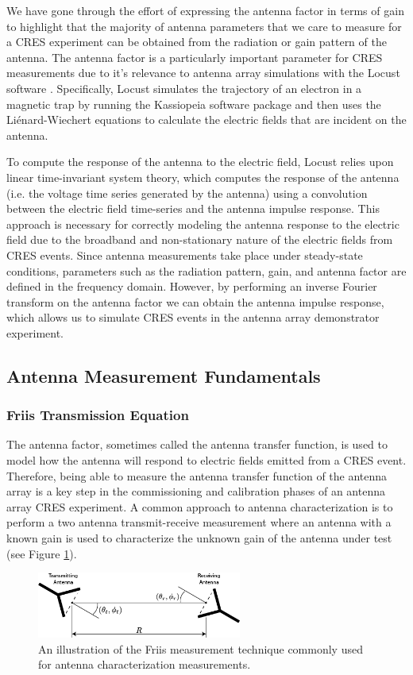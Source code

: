 We have gone through the effort of expressing the antenna factor in terms of gain to highlight that the majority of antenna parameters that we care to measure for a CRES experiment can be obtained from the radiation or gain pattern of the antenna. The antenna factor is a particularly important parameter for CRES measurements due to it's relevance to antenna array simulations with the Locust software \cite{p8locustpaper, nb_thesis}. Specifically, Locust simulates the trajectory of an electron in a magnetic trap by running the Kassiopeia software package \cite{kassiopeia} and then uses the Li\'{e}nard-Wiechert equations to calculate the electric fields that are incident on the antenna. 

To compute the response of the antenna to the electric field, Locust relies upon linear time-invariant system theory, which computes the response of the antenna (i.e. the voltage time series generated by the antenna) using a convolution between the electric field time-series and the antenna impulse response. This approach is necessary for correctly modeling the antenna response to the electric field due to the broadband and non-stationary nature of the electric fields from CRES events. Since antenna measurements take place under steady-state conditions, parameters such as the radiation pattern, gain, and antenna factor are defined in the frequency domain. However, by performing an inverse Fourier transform on the antenna factor we can obtain the antenna impulse response, which allows us to simulate CRES events in the antenna array demonstrator experiment. 

\subsection{Antenna Measurement Fundamentals}
\subsubsection{Friis Transmission Equation}

The antenna factor, sometimes called the antenna transfer function, is used to model how the antenna will respond to electric fields emitted from a CRES event. Therefore, being able to measure the antenna transfer function of the antenna array is a key step in the commissioning and calibration phases of an antenna array CRES experiment. A common approach to antenna characterization is to perform a two antenna transmit-receive measurement where an antenna with a known gain is used to characterize the unknown gain of the antenna under test (see Figure \ref{fig:friis-meas}). 
\begin{figure}[htbp]
    \centering
    \includegraphics[width=0.6\textwidth]{figs/Chapter-5/230409_friis_figure.png}
    \caption{An illustration of the Friis measurement technique commonly used for antenna characterization measurements.}
    \label{fig:friis-meas}
\end{figure}

